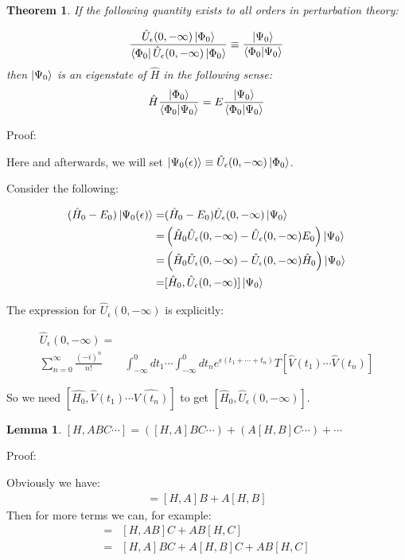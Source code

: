 \documentclass{article}
\numberwithin{equation}{subsection} %
\newtheorem{thm}{Theorem}
\newtheorem{lemma}{Lemma}
\begin{document}
\begin{thm}
	If the following quantity exists to all orders in perturbation theory:
	
	$$ \frac{\hat{U}_\epsilon(0,-\infty)\ket{\Phi_0}}{\bra{\Phi_0}\hat{U}_\epsilon(0,-\infty)\ket{\Phi_0}}
	\equiv
	\frac{\ket{\Psi_0}}{\braket{\Phi_0|\Psi_0}}
	$$
	then $\ket{\Psi_0}$ is an eigenstate of $\hat{H}$ in the following sense:
	$$\hat{H}\frac{\ket{\Phi_0}}{\braket{\Phi_0|\Psi_0}}
	=
	E \frac{\ket{\Psi_0}}{\braket{\Phi_0 |\Psi_0}}
	$$
\end{thm}

Proof:

Here and afterwards, we will set $\ket{\Psi_0(\epsilon)} \equiv \hat{U}_\epsilon(0,-\infty) \ket{\Phi_0}$.

Consider the following:

\begin{align}
(\hat{H}_0-E_0) \ket{\Psi_0(\epsilon)} =& (\hat{H}_0 - E_0)\hat{U}_\epsilon(0,-\infty)\ket{\Psi_0} \\		
=& \left( \hat{H}_0 \hat{U}_\epsilon(0,-\infty) - \hat{U}_\epsilon(0,-\infty)E_0\right)  \ket{\Psi_0} \\
=& \left( \hat{H}_0\hat{U}_\epsilon(0,-\infty) - \hat{U}_\epsilon(0,-\infty) \hat{H}_0\right) \ket{\Psi_0} \\
=& [\hat{H}_0, \hat{U}_\epsilon(0,-\infty)] \ket{\Psi_0}
\label{eq:6.46}
\end{align}

The expression for $\hat{U}_\epsilon(0,-\infty)$ is explicitly:

\begin{align}
\hat{U}_\epsilon(0,-\infty) =& \nonumber\\
\sum_{n=0}^{\infty} \frac{(-i)^n}{n!} &\int_{-\infty}^{0} dt_1 \dotsb \int_{-\infty}^{0} dt_n e^{\epsilon(t_1+\dotsb+t_n)} T[\hat{V}(t_1)\dotsb \hat{V}(t_n)]
\end{align}

So we need $[\hat{H_0}, \hat{V}(t_1)\dotsb\hat{{V}(t_n)}]$ to get $[\hat{H}_0, \hat{U}_\epsilon(0,-\infty)]$.

\begin{lemma}
	$[H,ABC\dotsb] = \left( [H,A] BC\dotsb\right)  + \left( A[H,B]C\dotsb\right)  + \dotsb$
\end{lemma}

Proof:

Obviously we have: 
\begin{align}[H,AB] = [H,A]B + A[H,B] \label{eq:HAB}\end{align}
Then for more terms we can, for example:
\begin{align}
[H,ABC] =& [H,AB] C + AB[H,C] \nonumber\\
=& [H,A]BC + A[H,B]C + AB[H,C] \nonumber
\end{align}
\end{document}
